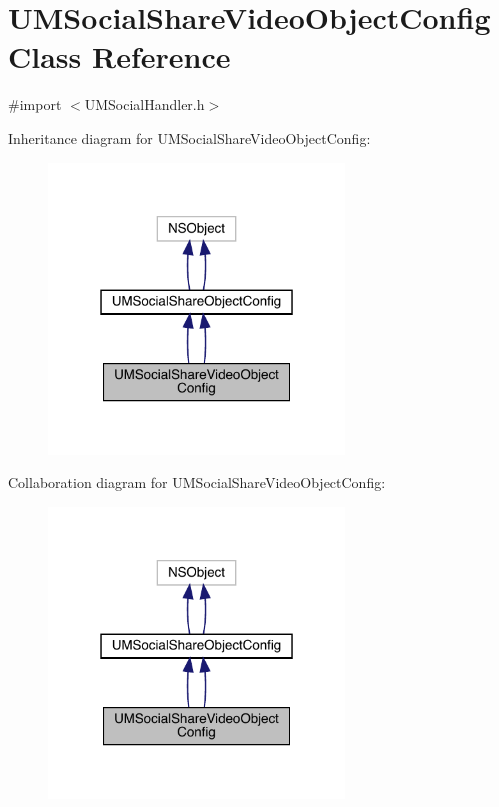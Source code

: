 \hypertarget{interface_u_m_social_share_video_object_config}{}\section{U\+M\+Social\+Share\+Video\+Object\+Config Class Reference}
\label{interface_u_m_social_share_video_object_config}


{\ttfamily \#import $<$U\+M\+Social\+Handler.\+h$>$}



Inheritance diagram for U\+M\+Social\+Share\+Video\+Object\+Config\+:\nopagebreak
\begin{figure}[H]
\begin{center}
\leavevmode
\includegraphics[width=223pt]{interface_u_m_social_share_video_object_config__inherit__graph}
\end{center}
\end{figure}


Collaboration diagram for U\+M\+Social\+Share\+Video\+Object\+Config\+:\nopagebreak
\begin{figure}[H]
\begin{center}
\leavevmode
\includegraphics[width=223pt]{interface_u_m_social_share_video_object_config__coll__graph}
\end{center}
\end{figure}
